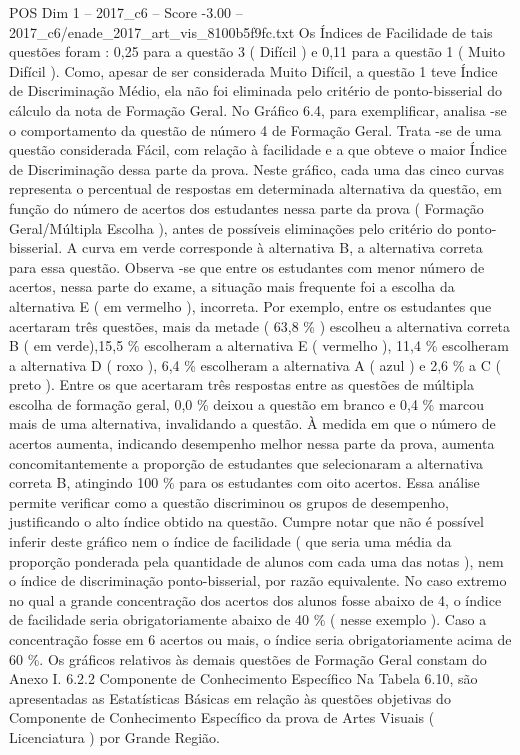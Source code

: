 \begin{textsample}{POS Dim 1 – 2017\_c6 – Score -3.00 – 2017\_c6/enade\_2017\_art\_vis\_8100b5f9fc.txt}
Os Índices de Facilidade de tais questões foram : 0,25 para a questão 3 ( Difícil ) e 0,11 para a questão 1 ( Muito Difícil ).
Como, apesar de ser considerada Muito Difícil, a questão 1 teve Índice de Discriminação Médio, ela não foi eliminada pelo critério de ponto-bisserial do cálculo da nota de Formação Geral.
No Gráfico 6.4, para exemplificar, analisa -se o comportamento da questão de número 4 de Formação Geral.
Trata -se de uma questão considerada Fácil, com relação à facilidade e a que obteve o maior Índice de Discriminação dessa parte da prova.
Neste gráfico, cada uma das cinco curvas representa o percentual de respostas em determinada alternativa da questão, em função do número de acertos dos estudantes nessa parte da prova ( Formação Geral/Múltipla Escolha ), antes de possíveis eliminações pelo critério do ponto-bisserial.
A curva em verde corresponde à alternativa B, a alternativa correta para essa questão.
Observa -se que entre os estudantes com menor número de acertos, nessa parte do exame, a situação mais frequente foi a escolha da alternativa E ( em vermelho ), incorreta.
Por exemplo, entre os estudantes que acertaram três questões, mais da metade ( 63,8 \% ) escolheu a alternativa correta B ( em verde),15,5 \% escolheram a alternativa E ( vermelho ), 11,4 \% escolheram a alternativa D ( roxo ), 6,4 \% escolheram a alternativa A ( azul ) e 2,6 \% a C ( preto ).
Entre os que acertaram três respostas entre as questões de múltipla escolha de formação geral, 0,0 \% deixou a questão em branco e 0,4 \% marcou mais de uma alternativa, invalidando a questão.
À medida em que o número de acertos aumenta, indicando desempenho melhor nessa parte da prova, aumenta concomitantemente a proporção de estudantes que selecionaram a alternativa correta B, atingindo 100 \% para os estudantes com oito acertos.
Essa análise permite verificar como a questão discriminou os grupos de desempenho, justificando o alto índice obtido na questão.
Cumpre notar que não é possível inferir deste gráfico nem o índice de facilidade ( que seria uma média da proporção ponderada pela quantidade de alunos com cada uma das notas ), nem o índice de discriminação ponto-bisserial, por razão equivalente.
No caso extremo no qual a grande concentração dos acertos dos alunos fosse abaixo de 4, o índice de facilidade seria obrigatoriamente abaixo de 40 \% ( nesse exemplo ).
Caso a concentração fosse em 6 acertos ou mais, o índice seria obrigatoriamente acima de 60 \%.
Os gráficos relativos às demais questões de Formação Geral constam do Anexo I. 6.2.2 Componente de Conhecimento Específico Na Tabela 6.10, são apresentadas as Estatísticas Básicas em relação às questões objetivas do Componente de Conhecimento Específico da prova de Artes Visuais ( Licenciatura ) por Grande Região.

\end{textsample}
